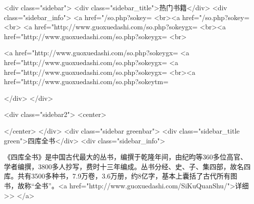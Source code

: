 <div class="sidebar">
<div class="sidebar_title">热门书籍</div>
<div class="sidebar_info">
<a href="/so.php?sokey=%
<br><a href="/so.php?sokey=%
<br>
<a href="http://www.guoxuedashi.com/so.php?sokeygx=%
<br><a href="http://www.guoxuedashi.com/so.php?sokeygx=%
<br>

<a href="http://www.guoxuedashi.com/so.php?sokeygx=%
<a href="http://www.guoxuedashi.com/so.php?sokeygx=%
<a href="http://www.guoxuedashi.com/so.php?sokeygx=%
<br><a href="http://www.guoxuedashi.com/so.php?sokeytm=%

</div>
</div>


<div class="sidebar2">
<center>

</center>
</div>
<div class="sidebar greenbar">
<div class="sidebar_title green">四库全书</div>
<div class="sidebar_info">

《四库全书》是中国古代最大的丛书，编撰于乾隆年间，由纪昀等360多位高官、学者编撰，3800多人抄写，费时十三年编成。丛书分经、史、子、集四部，故名四库。共有3500多种书，7.9万卷，3.6万册，约8亿字，基本上囊括了古代所有图书，故称“全书”。<a href="http://www.guoxuedashi.com/SiKuQuanShu/">详细>>
</a>

